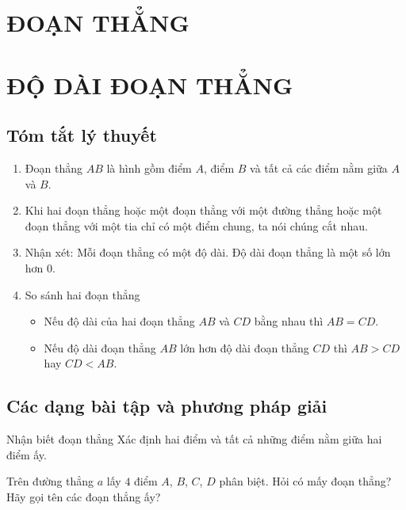 \section{ĐOẠN THẲNG}
\section{ĐỘ DÀI ĐOẠN THẲNG}
	\subsection{Tóm tắt lý thuyết}
		\begin{enumerate}
			\item Đoạn thẳng $ AB $ là hình gồm điểm $ A $, điểm $ B $ và tất cả các điểm nằm giữa $ A $ và $ B $.
			\item Khi hai đoạn thẳng hoặc một đoạn thẳng với một đường thẳng hoặc một đoạn thẳng với một tia chỉ có một điểm chung, ta nói chúng cắt nhau.
			\item Nhận xét: Mỗi đoạn thẳng có một độ dài. Độ dài đoạn thẳng là một số lớn hơn $ 0 $.
			\item So sánh hai đoạn thẳng
				\begin{itemize} 
				\item Nếu độ dài của hai đoạn thẳng $ AB $ và $ CD $ bằng nhau thì $ AB = CD $.
				\item Nếu độ dài đoạn thẳng $ AB $ lớn hơn độ dài đoạn thẳng $ CD $ thì $ AB > CD $ hay $ CD < AB $.
				\end{itemize}
		\end{enumerate}
	
	\subsection{Các dạng bài tập và phương pháp giải}
	\begin{dang}{Nhận biết đoạn thẳng}
		Xác định hai điểm và tất cả những điểm nằm giữa hai điểm ấy.
	\end{dang}
	\begin{vd}
		Trên đường thẳng $ a $ lấy $ 4 $ điểm $ A $, $ B $, $ C $, $ D $ phân biệt. Hỏi có mấy đoạn thẳng? Hãy gọi tên các đoạn thẳng ấy?
	\end{vd}
	
